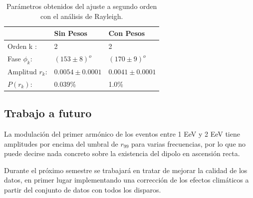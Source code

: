 		\begin{table}[H]
		\centering
			\begin{tabular}{l|l|l|}
			\cline{2-3}
			                                      & Sin Pesos 		 & Con Pesos \\ \hline
			\multicolumn{1}{|l|}{Orden k :}       & 2                & 2                    \\ \hline
			\multicolumn{1}{|l|}{Fase $\phi_k$:}  & $(153\pm8)^o$    & $(170\pm9)^o$                   \\ \hline
			\multicolumn{1}{|l|}{Amplitud $r_k$:} & $0.0054\pm0.0001$& $0.0041\pm0.0001$               \\ \hline
			\multicolumn{1}{|l|}{$P(r_k)$:}       & $0.039$\%        & 1.0\%  \\ \hline
			\end{tabular}
		\caption{Parámetros obtenidos del ajuste a segundo orden con el análisis de Rayleigh.}
		\label{table:parametros_second_order}
		\end{table}

\subsection{Trabajo a futuro}


La modulación del primer armónico de los eventos entre 1 EeV y 2 EeV tiene amplitudes por encima del umbral de $r_{99}$ para varias frecuencias, por lo que no puede decirse nada concreto sobre la existencia del dipolo en ascensión recta.


Durante el próximo semestre se trabajará en tratar de mejorar la calidad de los datos, en primer lugar implementando una corrección de los efectos climáticos a partir del conjunto de datos con todos los disparos.
